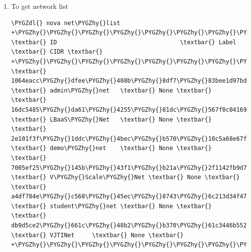 \documentclass[letterpaper,10pt,english]{sphinxmanual}
\def\PYGZdl{\char`\$}
\def\PYGZhy{\char`\-}
\begin{document}
\begin{enumerate}
\item {} 
To get network list

\begin{Verbatim}[commandchars=\\\{\}]
\PYGZdl{} nova net\PYGZhy{}list
+\PYGZhy{}\PYGZhy{}\PYGZhy{}\PYGZhy{}\PYGZhy{}\PYGZhy{}\PYGZhy{}\PYGZhy{}\PYGZhy{}\PYGZhy{}\PYGZhy{}\PYGZhy{}\PYGZhy{}\PYGZhy{}\PYGZhy{}\PYGZhy{}\PYGZhy{}\PYGZhy{}\PYGZhy{}\PYGZhy{}\PYGZhy{}\PYGZhy{}\PYGZhy{}\PYGZhy{}\PYGZhy{}\PYGZhy{}\PYGZhy{}\PYGZhy{}\PYGZhy{}\PYGZhy{}\PYGZhy{}\PYGZhy{}\PYGZhy{}\PYGZhy{}\PYGZhy{}\PYGZhy{}\PYGZhy{}\PYGZhy{}+\PYGZhy{}\PYGZhy{}\PYGZhy{}\PYGZhy{}\PYGZhy{}\PYGZhy{}\PYGZhy{}\PYGZhy{}\PYGZhy{}\PYGZhy{}\PYGZhy{}\PYGZhy{}\PYGZhy{}+\PYGZhy{}\PYGZhy{}\PYGZhy{}\PYGZhy{}\PYGZhy{}\PYGZhy{}+
\textbar{} ID                                   \textbar{} Label       \textbar{} CIDR \textbar{}
+\PYGZhy{}\PYGZhy{}\PYGZhy{}\PYGZhy{}\PYGZhy{}\PYGZhy{}\PYGZhy{}\PYGZhy{}\PYGZhy{}\PYGZhy{}\PYGZhy{}\PYGZhy{}\PYGZhy{}\PYGZhy{}\PYGZhy{}\PYGZhy{}\PYGZhy{}\PYGZhy{}\PYGZhy{}\PYGZhy{}\PYGZhy{}\PYGZhy{}\PYGZhy{}\PYGZhy{}\PYGZhy{}\PYGZhy{}\PYGZhy{}\PYGZhy{}\PYGZhy{}\PYGZhy{}\PYGZhy{}\PYGZhy{}\PYGZhy{}\PYGZhy{}\PYGZhy{}\PYGZhy{}\PYGZhy{}\PYGZhy{}+\PYGZhy{}\PYGZhy{}\PYGZhy{}\PYGZhy{}\PYGZhy{}\PYGZhy{}\PYGZhy{}\PYGZhy{}\PYGZhy{}\PYGZhy{}\PYGZhy{}\PYGZhy{}\PYGZhy{}+\PYGZhy{}\PYGZhy{}\PYGZhy{}\PYGZhy{}\PYGZhy{}\PYGZhy{}+
\textbar{} 1064eacc\PYGZhy{}dfee\PYGZhy{}408b\PYGZhy{}8df7\PYGZhy{}83bee1d97bd1 \textbar{} admin\PYGZhy{}net   \textbar{} None \textbar{}
\textbar{} 16dc5485\PYGZhy{}da61\PYGZhy{}4255\PYGZhy{}81dc\PYGZhy{}567f0c041699 \textbar{} LBaaS\PYGZhy{}Net   \textbar{} None \textbar{}
\textbar{} 2e101f3f\PYGZhy{}1ddc\PYGZhy{}4bec\PYGZhy{}b570\PYGZhy{}10c5a68e67f3 \textbar{} demo\PYGZhy{}net    \textbar{} None \textbar{}
\textbar{} 7005ef25\PYGZhy{}145b\PYGZhy{}43f1\PYGZhy{}b21a\PYGZhy{}2f1142fb9d79 \textbar{} V\PYGZhy{}Scale\PYGZhy{}Net \textbar{} None \textbar{}
\textbar{} a4df784e\PYGZhy{}c568\PYGZhy{}45ec\PYGZhy{}8743\PYGZhy{}6c213d34f477 \textbar{} student\PYGZhy{}net \textbar{} None \textbar{}
\textbar{} db9d5ce2\PYGZhy{}661c\PYGZhy{}48b2\PYGZhy{}b370\PYGZhy{}61c3446b552b \textbar{} VJTINet     \textbar{} None \textbar{}
+\PYGZhy{}\PYGZhy{}\PYGZhy{}\PYGZhy{}\PYGZhy{}\PYGZhy{}\PYGZhy{}\PYGZhy{}\PYGZhy{}\PYGZhy{}\PYGZhy{}\PYGZhy{}\PYGZhy{}\PYGZhy{}\PYGZhy{}\PYGZhy{}\PYGZhy{}\PYGZhy{}\PYGZhy{}\PYGZhy{}\PYGZhy{}\PYGZhy{}\PYGZhy{}\PYGZhy{}\PYGZhy{}\PYGZhy{}\PYGZhy{}\PYGZhy{}\PYGZhy{}\PYGZhy{}\PYGZhy{}\PYGZhy{}\PYGZhy{}\PYGZhy{}\PYGZhy{}\PYGZhy{}\PYGZhy{}\PYGZhy{}+\PYGZhy{}\PYGZhy{}\PYGZhy{}\PYGZhy{}\PYGZhy{}\PYGZhy{}\PYGZhy{}\PYGZhy{}\PYGZhy{}\PYGZhy{}\PYGZhy{}\PYGZhy{}\PYGZhy{}+\PYGZhy{}\PYGZhy{}\PYGZhy{}\PYGZhy{}\PYGZhy{}\PYGZhy{}+
\end{Verbatim}


\end{enumerate}
\end{document}
